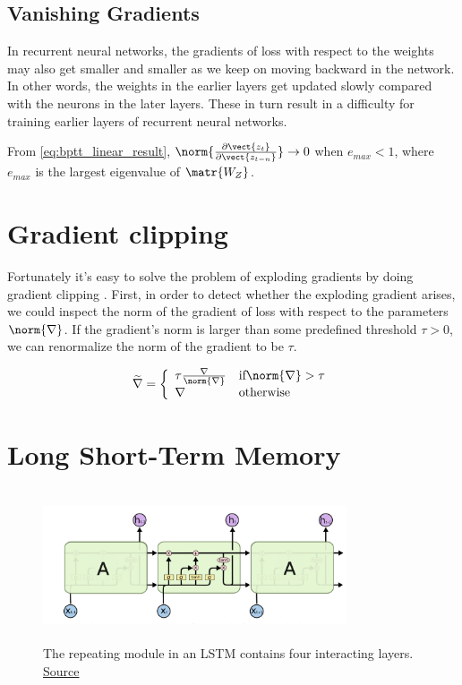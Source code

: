 \subsection{Vanishing Gradients}
In recurrent neural networks, the gradients of loss with respect to the weights may also get smaller and smaller as we keep on moving backward in the network. 
In other words, the weights in the earlier layers get updated slowly compared with the neurons in the later layers.
These in turn result in a difficulty for training earlier layers of recurrent neural networks.

From \cref{eq:bptt_linear_result}, $\norm{\frac{\partial \vect{z_t}}{\partial \vect{z_{t-n}}}} \rightarrow 0$ when $e_{max} < 1$, where $e_{max}$ is the largest eigenvalue of $\matr{W_Z}$.

\section{Gradient clipping}
Fortunately it's easy to solve the problem of exploding gradients by doing gradient clipping \cite{1211.5063}.
First, in order to detect whether the exploding gradient arises, we could inspect the norm of the gradient of loss with respect to the parameters $\norm{\nabla}$.
If the gradient's norm is larger than some predefined threshold $\tau > 0$, we can renormalize the norm of the gradient to be $\tau$.

\[
\widetilde{\nabla}=\left\{
            \begin{array}{ll}
              \tau\frac{\nabla}{\norm{\nabla}} & \text{if}  \norm{\nabla}>\tau\\
              \nabla & \text{otherwise}
            \end{array}
          \right.
\]

\section{Long Short-Term Memory}
\label{sec:long-short-term-memory}


\begin{figure}[h]
  \centering
      \includegraphics[width=0.8\textwidth,height=4.5cm]{lectures/06-b/image/lstm.png}
          \caption{
            The repeating module in an LSTM contains four interacting layers.
            \href{http://colah.github.io/posts/2015-08-Understanding-LSTMs/}{Source}
          }
          \label{fig:lstm}
\end{figure}


